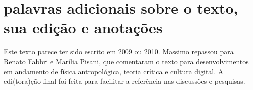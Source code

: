 \documentclass[a4paper, 12pt]{article} %
\begin{document}
\section*{palavras adicionais sobre o texto, sua edição e anotações}\label{sec:pal}
Este texto parece ter sido escrito em 2009 ou 2010. Massimo repassou para Renato Fabbri e Marília Pisani,
 que comentaram o texto para desenvolvimentos em andamento de física antropológica, teoria crítica e cultura digital.
A edi(tora)ção final foi feita para facilitar a referência nas discussões e pesquisas.



%
%


\end{document}
